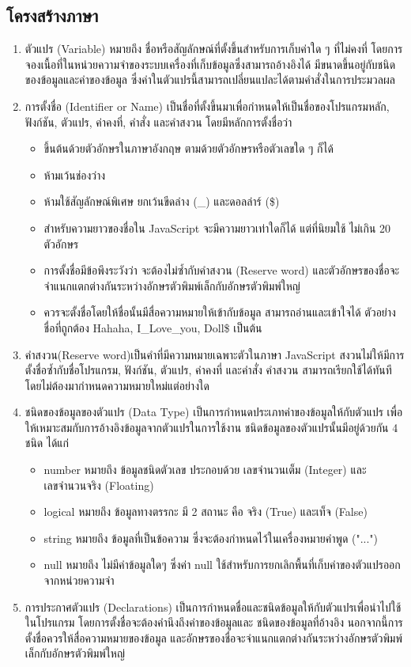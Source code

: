 	 \subsection{โครงสร้างภาษา}
	 	\begin{enumerate}
		 \item ตัวแปร (Variable) หมายถึง ชื่อหรือสัญลักษณ์ที่ตั้งขึ้นสำหรับการเก็บค่าใด ๆ ที่ไม่คงที่ โดยการจองเนื้อที่ในหน่วยความจำของระบบเครื่องที่เก็บข้อมูลซึ่งสามารถอ้างอิงได้ มีขนาดขึ้นอยู่กับชนิดของข้อมูลและค่าของข้อมูล ซึ่งค่าในตัวแปรนี้สามารถเปลี่ยนแปละได้ตามคำสั่งในการประมวลผล
		 
		 \item การตั้งชื่อ (Identifier or Name) เป็นชื่อที่ตั้งขึ้นมาเพื่อกำหนดให้เป็นชื่อของโปรแกรมหลัก, ฟังก์ชัน, ตัวแปร, ค่าคงที่, คำสั่ง และคำสงวน โดยมีหลักการตั้งชื่อว่า
			 \begin{itemize}
				\item ขึ้นต้นด้วยตัวอักษรในภาษาอังกฤษ ตามด้วยตัวอักษรหรือตัวเลขใด ๆ ก็ได้ 
				\item ห้ามเว้นช่องว่าง 
				\item ห้ามใช้สัญลักษณ์พิเศษ ยกเว้นขีดล่าง (\_) และดอลล่าร์ (\$) 
				\item สำหรับความยาวของชื่อใน JavaScript จะมีความยาวเท่าใดก็ได้ แต่ที่นิยมใช้ ไม่เกิน 20 ตัวอักษร 
				\item การตั้งชื่อมีข้อพึงระวังว่า จะต้องไม่ซ้ำกับคำสงวน (Reserve word) และตัวอักษรของชื่อจะจำแนกแตกต่างกันระหว่างอักษรตัวพิมพ์เล็กกับอักษรตัวพิมพ์ใหญ่ 
			    \item ควรจะตั้งชื่อโดยให้ชื่อนั้นมีสื่อความหมายให้เข้ากับข้อมูล สามารถอ่านและเข้าใจได้ 
				ตัวอย่างชื่อที่ถูกต้อง Hahaha, I\_Love\_you, Doll\$ เป็นต้น
			 \end{itemize}
		 \item คำสงวน(Reserve word)เป็นคำที่มีความหมายเฉพาะตัวในภาษา JavaScript สงวนไม่ให้มีการตั้งชื่อซ้ำกับชื่อโปรแกรม, ฟังก์ชัน, ตัวแปร, ค่าคงที่ และคำสั่ง คำสงวน สามารถเรียกใช้ได้ทันทีโดยไม่ต้องมากำหนดความหมายใหม่แต่อย่างใด
	
		 \item ชนิดของข้อมูลของตัวแปร (Data Type) เป็นการกำหนดประเภทค่าของข้อมูลให้กับตัวแปร เพื่อให้เหมาะสมกับการอ้างอิงข้อมูลจากตัวแปรในการใช้งาน ชนิดข้อมูลของตัวแปรนั้นมีอยู่ด้วยกัน 4 ชนิด ได้แก่
			 \begin{itemize}
				 \item number หมายถึง ข้อมูลชนิดตัวเลข ประกอบด้วย เลขจำนวนเต็ม (Integer) และเลขจำนวนจริง (Floating) 
				 \item logical หมายถึง ข้อมูลทางตรรกะ มี 2 สถานะ คือ จริง (True) และเท็จ (False) 
				 \item string หมายถึง ข้อมูลที่เป็นข้อความ ซึ่งจะต้องกำหนดไว้ในเครื่องหมายคำพูด ("...") 
				 \item null หมายถึง ไม่มีค่าข้อมูลใดๆ ซึ่งค่า null ใช้สำหรับการยกเลิกพื้นที่เก็บค่าของตัวแปรออกจากหน่วยความจำ 
			 \end{itemize}
		 \item การประกาศตัวแปร (Declarations) เป็นการกำหนดชื่อและชนิดข้อมูลให้กับตัวแปรเพื่อนำไปใช้ในโปรแกรม โดยการตั้งชื่อจะต้องคำนึงถึงค่าของข้อมูลและ ชนิดของข้อมูลที่อ้างอิง นอกจากนี้การตั้งชื่อควรให้สื่อความหมายของข้อมูล และอักษรของชื่อจะจำแนกแตกต่างกันระหว่างอักษรตัวพิมพ์เล็กกับอักษรตัวพิมพ์ใหญ่
		 

\end{enumerate}
